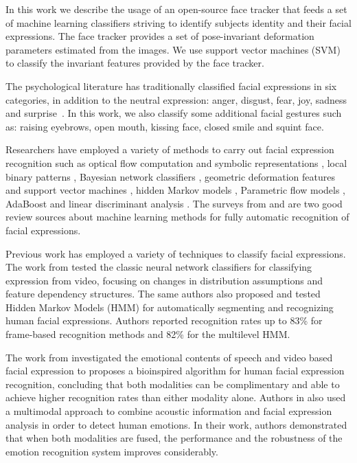 \documentclass[]{article}
\begin{document}
In this work we describe the usage of an open-source face tracker that feeds a set of machine learning classifiers
striving to identify subjects identity and their facial expressions. The face tracker provides a set of pose-invariant
deformation parameters estimated from the images. We use support vector machines (SVM) to classify the invariant
features provided by the face tracker.


The psychological literature has traditionally classified facial expressions in six categories, in addition to the
neutral expression: anger, disgust, fear, joy, sadness and surprise~\cite{schmidt2002human}. In this work, we also
classify some additional facial gestures such as: raising eyebrows, open mouth, kissing face, closed smile and squint
face.


Researchers have employed a variety of methods to carry out facial expression recognition such as optical flow
computation  and symbolic representations \cite{Yacoob506414}, local binary patterns \cite{Shan2009803},  Bayesian
network classifiers \cite{Cohen1211408}, geometric deformation features and support vector machines
\cite{kotsia4032815}, hidden Markov models \cite{aleksic1597130, Cohen2003160}, Parametric flow models
\cite{blackAndYacoob}, AdaBoost and linear discriminant analysis \cite{bartlett1398364}. The surveys from
\cite{bartlett1398364} and \cite{Fasel2003259} are two good review sources about machine learning methods 
for fully automatic recognition of facial expressions. 


Previous work has employed a variety of techniques to classify  facial expressions. The work from \cite{Cohen2003160}
tested the classic neural network classifiers for classifying expression from video, focusing on changes in distribution
assumptions and feature dependency structures. The same authors also proposed and tested Hidden Markov Models (HMM) for
automatically segmenting and recognizing human facial expressions. Authors reported recognition rates up to 83\% for
frame-based recognition methods and 82\% for the multilevel HMM.


The work from \cite{Chen670976} investigated the emotional contents of speech and video based facial expression to
proposes a bioinspired algorithm for human facial expression recognition, concluding that both modalities can be
complimentary and able to achieve higher recognition rates than either modality alone. Authors in \cite{Busso:2004} also
used a multimodal approach to combine acoustic information and facial expression analysis in order to detect human
emotions. In their work, authors demonstrated that when both modalities are fused, the performance and the robustness of
the emotion recognition system improves considerably.
\end{document}
